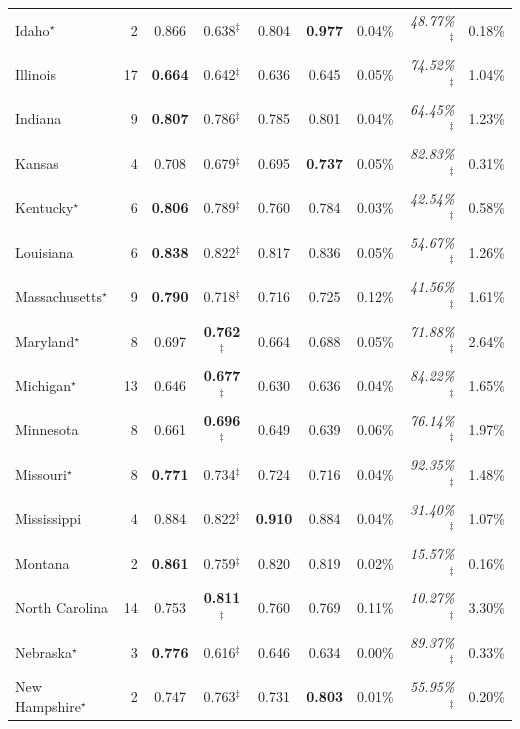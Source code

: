 \begin{longtable}{l r cccc rrr}
Idaho$^{\star}$ & 2 & 0.866 & 0.638$^{\ddagger}$ & 0.804 & \textbf{0.977} & 0.04\% & \textit{48.77\%}$^{\ddagger}$ & 0.18\% \\
Illinois & 17 & \textbf{0.664} & 0.642$^{\ddagger}$ & 0.636 & 0.645 & 0.05\% & \textit{74.52\%}$^{\ddagger}$ & 1.04\% \\
Indiana & 9 & \textbf{0.807} & 0.786$^{\ddagger}$ & 0.785 & 0.801 & 0.04\% & \textit{64.45\%}$^{\ddagger}$ & 1.23\% \\
Kansas & 4 & 0.708 & 0.679$^{\ddagger}$ & 0.695 & \textbf{0.737} & 0.05\% & \textit{82.83\%}$^{\ddagger}$ & 0.31\% \\
Kentucky$^{\star}$ & 6 & \textbf{0.806} & 0.789$^{\ddagger}$ & 0.760 & 0.784 & 0.03\% & \textit{42.54\%}$^{\ddagger}$ & 0.58\% \\
Louisiana & 6 & \textbf{0.838} & 0.822$^{\ddagger}$ & 0.817 & 0.836 & 0.05\% & \textit{54.67\%}$^{\ddagger}$ & 1.26\% \\
Massachusetts$^{\star}$ & 9 & \textbf{0.790} & 0.718$^{\ddagger}$ & 0.716 & 0.725 & 0.12\% & \textit{41.56\%}$^{\ddagger}$ & 1.61\% \\
Maryland$^{\star}$ & 8 & 0.697 & \textbf{0.762}$^{\ddagger}$ & 0.664 & 0.688 & 0.05\% & \textit{71.88\%}$^{\ddagger}$ & 2.64\% \\
Michigan$^{\star}$ & 13 & 0.646 & \textbf{0.677}$^{\ddagger}$ & 0.630 & 0.636 & 0.04\% & \textit{84.22\%}$^{\ddagger}$ & 1.65\% \\
Minnesota & 8 & 0.661 & \textbf{0.696}$^{\ddagger}$ & 0.649 & 0.639 & 0.06\% & \textit{76.14\%}$^{\ddagger}$ & 1.97\% \\
Missouri$^{\star}$ & 8 & \textbf{0.771} & 0.734$^{\ddagger}$ & 0.724 & 0.716 & 0.04\% & \textit{92.35\%}$^{\ddagger}$ & 1.48\% \\
Mississippi & 4 & 0.884 & 0.822$^{\ddagger}$ & \textbf{0.910} & 0.884 & 0.04\% & \textit{31.40\%}$^{\ddagger}$ & 1.07\% \\
Montana & 2 & \textbf{0.861} & 0.759$^{\ddagger}$ & 0.820 & 0.819 & 0.02\% & \textit{15.57\%}$^{\ddagger}$ & 0.16\% \\
North Carolina & 14 & 0.753 & \textbf{0.811}$^{\ddagger}$ & 0.760 & 0.769 & 0.11\% & \textit{10.27\%}$^{\ddagger}$ & 3.30\% \\
Nebraska$^{\star}$ & 3 & \textbf{0.776} & 0.616$^{\ddagger}$ & 0.646 & 0.634 & 0.00\% & \textit{89.37\%}$^{\ddagger}$ & 0.33\% \\
New Hampshire$^{\star}$ & 2 & 0.747 & 0.763$^{\ddagger}$ & 0.731 & \textbf{0.803} & 0.01\% & \textit{55.95\%}$^{\ddagger}$ & 0.20\% \\

\end{longtable}
